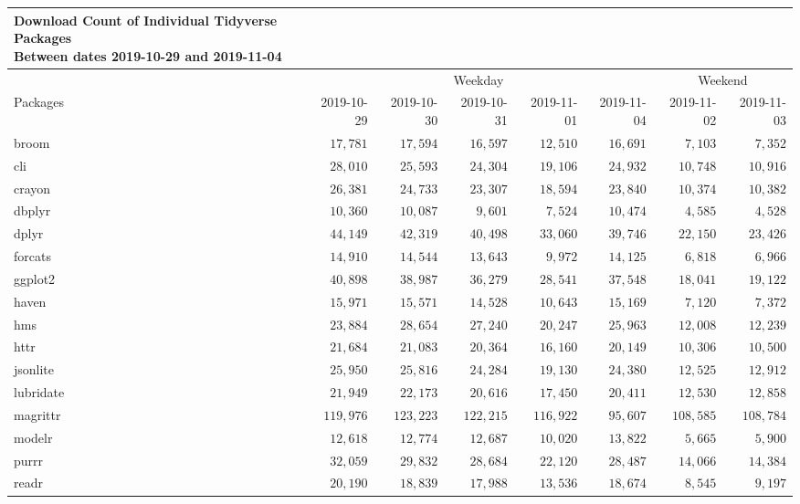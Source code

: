 \documentclass[]{article}
\begin{document}
\captionsetup[table]{labelformat=empty,skip=1pt}
\begin{longtable}{lrrrrrrr}
\caption*{
\large Download Count of Individual Tidyverse Packages\\ 
\small Between dates 2019-10-29 and 2019-11-04\\ 
} \\ 
\toprule
& \multicolumn{5}{c}{Weekday} & \multicolumn{2}{c}{Weekend} \\ 
 \cmidrule(lr){2-6}\cmidrule(lr){7-8}
Packages & 2019-10-29 & 2019-10-30 & 2019-10-31 & 2019-11-01 & 2019-11-04 & 2019-11-02 & 2019-11-03 \\ 
\midrule
broom & $17,781$ & $17,594$ & $16,597$ & $12,510$ & $16,691$ & $7,103$ & $7,352$ \\ 
cli & $28,010$ & $25,593$ & $24,304$ & $19,106$ & $24,932$ & $10,748$ & $10,916$ \\ 
crayon & $26,381$ & $24,733$ & $23,307$ & $18,594$ & $23,840$ & $10,374$ & $10,382$ \\ 
dbplyr & $10,360$ & $10,087$ & $9,601$ & $7,524$ & $10,474$ & $4,585$ & $4,528$ \\ 
dplyr & $44,149$ & $42,319$ & $40,498$ & $33,060$ & $39,746$ & $22,150$ & $23,426$ \\ 
forcats & $14,910$ & $14,544$ & $13,643$ & $9,972$ & $14,125$ & $6,818$ & $6,966$ \\ 
ggplot2 & $40,898$ & $38,987$ & $36,279$ & $28,541$ & $37,548$ & $18,041$ & $19,122$ \\ 
haven & $15,971$ & $15,571$ & $14,528$ & $10,643$ & $15,169$ & $7,120$ & $7,372$ \\ 
hms & $23,884$ & $28,654$ & $27,240$ & $20,247$ & $25,963$ & $12,008$ & $12,239$ \\ 
httr & $21,684$ & $21,083$ & $20,364$ & $16,160$ & $20,149$ & $10,306$ & $10,500$ \\ 
jsonlite & $25,950$ & $25,816$ & $24,284$ & $19,130$ & $24,380$ & $12,525$ & $12,912$ \\ 
lubridate & $21,949$ & $22,173$ & $20,616$ & $17,450$ & $20,411$ & $12,530$ & $12,858$ \\ 
magrittr & $119,976$ & $123,223$ & $122,215$ & $116,922$ & $95,607$ & $108,585$ & $108,784$ \\ 
modelr & $12,618$ & $12,774$ & $12,687$ & $10,020$ & $13,822$ & $5,665$ & $5,900$ \\ 
purrr & $32,059$ & $29,832$ & $28,684$ & $22,120$ & $28,487$ & $14,066$ & $14,384$ \\ 
readr & $20,190$ & $18,839$ & $17,988$ & $13,536$ & $18,674$ & $8,545$ & $9,197$ \\ 

\end{longtable}
\end{document}
